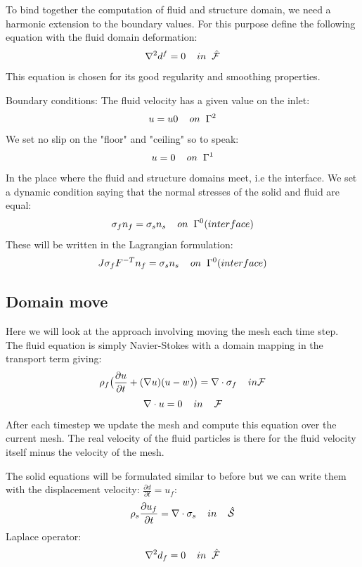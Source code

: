 To bind together the computation of fluid and structure domain, we need a harmonic extension to the boundary values. For this purpose define the following equation with the fluid domain deformation:
$$ \nabla^2 d^f = 0\hspace{4mm}in \hspace{2mm} \mathcal{\hat{F}}$$
This equation is chosen for its good regularity and smoothing properties.

Boundary conditions:
The fluid velocity has a given value on the inlet:
$$ u = u0 \hspace{4mm}on \hspace{2mm} \Gamma^2$$
We set no slip on the "floor" and "ceiling" so to speak:
$$ u = 0  \hspace{4mm}on \hspace{2mm} \Gamma^1  $$
In the place where the fluid and structure domains meet, i.e the interface. We set a dynamic condition saying that the normal stresses of the solid and fluid are equal:
$$  \sigma_f n_f = \sigma_s n_s \hspace{4mm} on  \hspace{2mm}\Gamma^0 (interface)   $$
These will be written in the Lagrangian formulation:
$$  J\sigma_f F^{-T} n_f = \sigma_s  n_s \hspace{4mm} on  \hspace{2mm}\Gamma^0 (interface)   $$

\subsection*{Domain move}
Here we will look at the approach involving moving the mesh each time step. \\
The fluid equation is simply Navier-Stokes with a domain mapping in the transport term giving:
$$ \rho_f \big( \frac{\partial u}{\partial t} + (\nabla u)(u-w)\big) = \nabla \cdot \sigma_f \hspace{4mm} in \mathcal{F}$$
$$ \nabla \cdot u = 0  \hspace{4mm} in \hspace{4mm} \mathcal{F} $$
After each timestep we update the mesh and compute this equation over the current mesh. The real velocity of the fluid particles is there for the fluid velocity itself minus the velocity of the mesh. 

The solid equations will be formulated similar to before but we can write them with the displacement velocity: $ \frac{\partial d}{\partial t} = u_f $:
$$ \rho_s \frac{\partial u_f}{\partial t} = \nabla \cdot \sigma_s \hspace{4mm}in\hspace{4mm} \mathcal{\hat{S}} $$
Laplace operator:
$$ \nabla^2 d_f = 0\hspace{4mm}in \hspace{2mm} \mathcal{\hat{F}}$$

